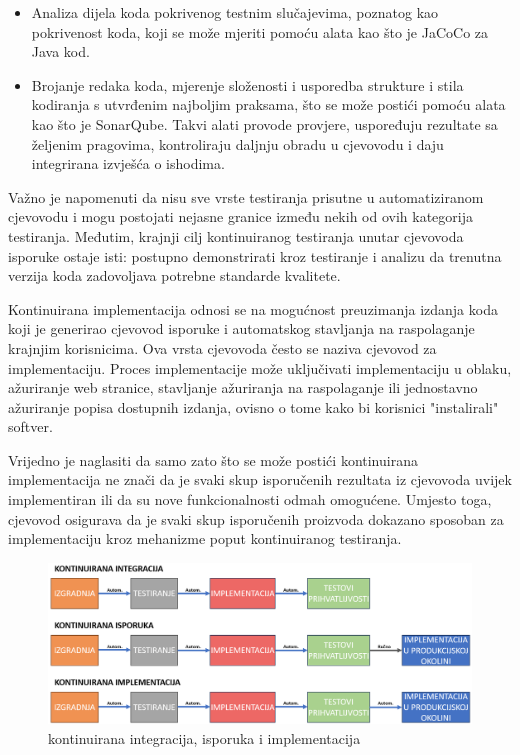 \documentclass[a4paper,12pt,oneside]{article}
\begin{document}
\begin{itemize}
\item Analiza dijela koda pokrivenog testnim slučajevima, poznatog kao pokrivenost koda, koji se može mjeriti pomoću alata kao što je JaCoCo za Java kod.
\item Brojanje redaka koda, mjerenje složenosti i usporedba strukture i stila kodiranja s utvrđenim najboljim praksama, što se može postići pomoću alata kao što je SonarQube. Takvi alati provode provjere, uspoređuju rezultate sa željenim pragovima, kontroliraju daljnju obradu u cjevovodu i daju integrirana izvješća o ishodima.

\end{itemize}


Važno je napomenuti da nisu sve vrste testiranja prisutne u automatiziranom cjevovodu i mogu postojati nejasne granice između nekih od ovih kategorija testiranja. Međutim, krajnji cilj kontinuiranog testiranja unutar cjevovoda isporuke ostaje isti: postupno demonstrirati kroz testiranje i analizu da trenutna verzija koda zadovoljava potrebne standarde kvalitete.

Kontinuirana implementacija odnosi se na mogućnost preuzimanja izdanja koda koji je generirao cjevovod isporuke i automatskog stavljanja na raspolaganje krajnjim korisnicima. Ova vrsta cjevovoda često se naziva cjevovod za implementaciju. Proces implementacije može uključivati implementaciju u oblaku, ažuriranje web stranice, stavljanje ažuriranja na raspolaganje ili jednostavno ažuriranje popisa dostupnih izdanja, ovisno o tome kako bi korisnici "instalirali" softver.

Vrijedno je naglasiti da samo zato što se može postići kontinuirana implementacija ne znači da je svaki skup isporučenih rezultata iz cjevovoda uvijek implementiran ili da su nove funkcionalnosti odmah omogućene. Umjesto toga, cjevovod osigurava da je svaki skup isporučenih proizvoda dokazano sposoban za implementaciju kroz mehanizme poput kontinuiranog testiranja.

\begin{figure}[ht!] %
	\centering %
	\includegraphics[scale=0.36]{./Slike/kontinuirana integracija, isporuka i implementacija.png} %
	\caption{kontinuirana integracija, isporuka i implementacija \cite{ci_tools_slika} \label{f:kontinuirana integracija, isporuka i implementacija}} %
\end{figure}
\end{document}
